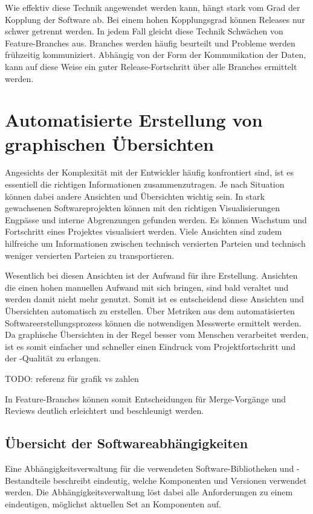 Wie effektiv diese Technik angewendet werden kann, hängt stark vom Grad der Kopplung der Software ab. Bei einem hohen Kopplungsgrad können Releases nur schwer getrennt werden. In jedem Fall gleicht diese Technik Schwächen von Feature-Branches aus. Branches werden häufig beurteilt und Probleme werden frühzeitig kommuniziert. Abhängig von der Form der Kommunikation der Daten, kann auf diese Weise ein guter Release-Fortschritt über alle Branches ermittelt werden. 

\section{Automatisierte Erstellung von graphischen Übersichten}

Angesichts der Komplexität mit der Entwickler häufig konfrontiert sind, ist es essentiell die richtigen Informationen zusammenzutragen. Je nach Situation können dabei andere Ansichten und Übersichten wichtig sein. In stark gewachsenen Softwareprojekten können mit den richtigen Visualisierungen Engpässe und interne Abgrenzungen gefunden werden. Es können Wachstum und Fortschritt eines Projektes visualisiert werden. Viele Ansichten sind zudem hilfreiche um Informationen zwischen technisch versierten Parteien und technisch weniger versierten Parteien zu transportieren.

Wesentlich bei diesen Ansichten ist der Aufwand für ihre Erstellung. Ansichten die einen hohen manuellen Aufwand mit sich bringen, sind bald veraltet und werden damit nicht mehr genutzt. Somit ist es entscheidend diese Ansichten und Übersichten automatisch zu erstellen. Über Metriken aus dem automatisierten Softwareerstellungsprozess können die notwendigen Messwerte ermittelt werden. Da graphische Übersichten in der Regel besser vom Menschen verarbeitet werden, ist es somit einfacher und schneller einen Eindruck vom Projektfortschritt und der -Qualität zu erlangen.

TODO: referenz für grafik vs zahlen

In Feature-Branches können somit Entscheidungen für Merge-Vorgänge und Reviews deutlich erleichtert und beschleunigt werden.

\subsection{Übersicht der Softwareabhängigkeiten} 

Eine Abhängigkeitsverwaltung für die verwendeten Software-Bibliotheken und -Bestandteile beschreibt eindeutig, welche Komponenten und Versionen verwendet werden. Die Abhängigkeitsverwaltung löst dabei alle Anforderungen zu einem eindeutigen, möglichst aktuellen Set an Komponenten auf.


